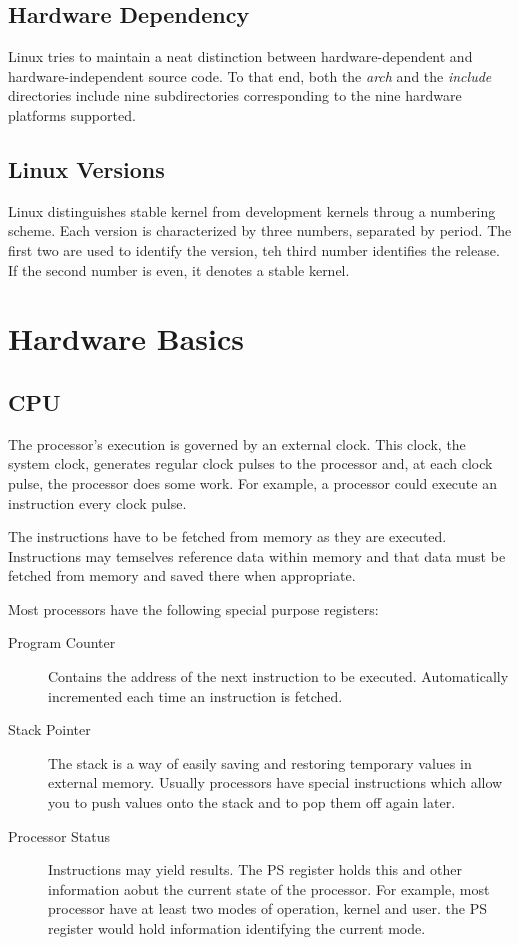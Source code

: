 \documentclass[a4paper,12pt]{book}
\begin{document}
\section{Hardware Dependency}
Linux tries to maintain a neat distinction between hardware-dependent and
hardware-independent source code. To that end, both the \emph{arch} and the
\emph{include} directories include nine subdirectories corresponding to the nine
hardware platforms supported. 
\section{Linux Versions}
Linux distinguishes stable kernel from development kernels throug a numbering
scheme. Each version is characterized by three numbers, separated by period. The
first two are used to identify the version, teh third number identifies the
release. If the second number is even, it denotes a stable kernel.

\chapter{Hardware Basics}
\section{CPU}
The processor's execution is governed by an external clock. This clock, the
system clock, generates regular clock pulses to the processor and, at each clock
pulse, the processor does some work. For example, a processor could execute an
instruction every clock pulse. 

The instructions have to be fetched from memory as they are executed.
Instructions may temselves reference data within memory and that data must be
fetched from memory and saved there when appropriate. 

Most processors have the following special purpose registers:
\begin{description}
\item[Program Counter] Contains the address of the next instruction to be
executed. Automatically incremented each time an instruction is fetched.
\item[Stack Pointer] The stack is a way of easily saving and restoring temporary
values in external memory. Usually processors have special instructions which
allow you to push values onto the stack and to pop them off again later. 
\item[Processor Status] Instructions may yield results. The PS register holds
this and other information aobut the current state of the processor. For
example, most processor have at least two modes of operation, kernel and user.
the PS register would hold information identifying the current mode.
\end{description}
\end{document}

